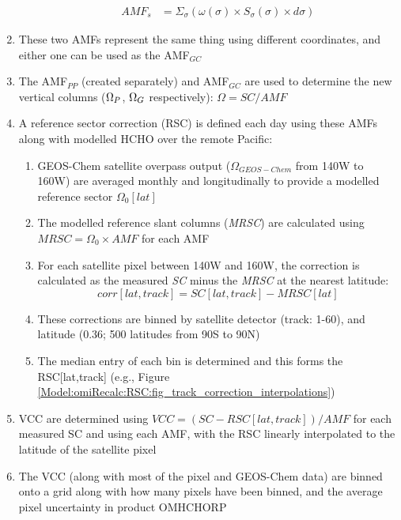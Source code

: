 \begin{enumerate}
\begin{enumerate}
\begin{align}
          AMF_s &= \Sigma_{\sigma} \left(\omega(\sigma) \times S_{\sigma}(\sigma) \times d\sigma \right)
        \end{align}
      \end{enumerate}
      \item These two AMFs represent the same thing using different coordinates, and either one can be used as the AMF$_{GC}$
      \item The AMF$_{PP}$ (created separately) and AMF$_{GC}$ are used to determine the new vertical columns ($\Omega_{P}$, $\Omega_{G}$ respectively): $\Omega = SC/AMF$
      \item A reference sector correction (RSC) is defined each day using these AMFs along with modelled HCHO over the remote Pacific:
      \begin{enumerate}
        \item GEOS-Chem satellite overpass output ($\Omega_{GEOS-Chem}$ from 140{\degr}W to 160{\degr}W) are averaged monthly and longitudinally to provide a modelled reference sector $\Omega_0[lat]$
        \item The modelled reference slant columns (\textit{MRSC}) are calculated using $MRSC = \Omega_0 \times AMF$ for each AMF
        \item For each satellite pixel between 140{\degr}W and 160{\degr}W, the correction is calculated as the measured \textit{SC} minus the \textit{MRSC} at the nearest latitude:
        \begin{equation*}
          corr[lat,track] = SC[lat,track] - MRSC[lat]
        \end{equation*}
        \item These corrections are binned by satellite detector (track: 1-60), and latitude (0.36\degr; 500 latitudes from 90{\degr}S to 90{\degr}N)
        \item The median entry of each bin is determined and this forms the RSC[lat,track] (e.g., Figure \ref{Model:omiRecalc:RSC:fig_track_correction_interpolations})
      \end{enumerate}
      \item VCC are determined using $VCC = (SC - RSC[lat,track] )/AMF$ for each measured SC and using each AMF, with the RSC linearly interpolated to the latitude of the satellite pixel
      \item The VCC (along with most of the pixel and GEOS-Chem data) are binned onto a \highhr grid along with how many pixels have been binned, and the average pixel uncertainty in product OMHCHORP
    \end{enumerate}
 
